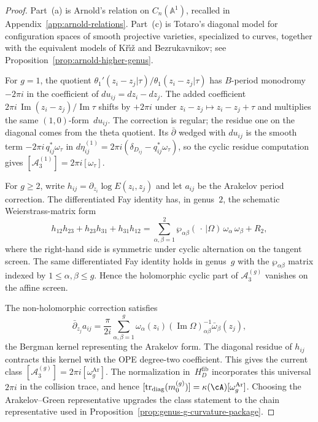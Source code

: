 \begin{proof}
Part~\textup{(a)} is Arnold's relation on
$C_n(\mathbb A^1)$, recalled in
Appendix~\ref{app:arnold-relations}. Part~\textup{(c)} is
Totaro's diagonal model for configuration spaces of smooth
projective varieties, specialized to curves, together with the
equivalent models of K\v{r}\'{\i}\v{z} and Bezrukavnikov; see
Proposition~\ref{prop:arnold-higher-genus}.

For $g=1$, the quotient
$\theta_1'(z_i-z_j|\tau)/\theta_1(z_i-z_j|\tau)$ has
$B$-period monodromy $-2\pi i$ in the coefficient of
$du_{ij}=dz_i-dz_j$. The added coefficient
$2\pi i\,\operatorname{Im}(z_i-z_j)/\operatorname{Im}\tau$ shifts by
$+2\pi i$ under $z_i-z_j\mapsto z_i-z_j+\tau$ and multiplies the same
$(1,0)$-form~$du_{ij}$. The correction is regular; the residue one on
the diagonal comes from the theta quotient. Its $\bar\partial$ wedged
with $du_{ij}$ is the smooth term
$-2\pi i\,q_{ij}^{*}\omega_\tau$ in
$d\eta_{ij}^{(1)}=2\pi i(\delta_{D_{ij}}-q_{ij}^{*}\omega_\tau)$, so
the cyclic residue computation gives
$[\mathcal A_3^{(1)}]=2\pi i[\omega_\tau]$.

For $g\ge2$, write
$h_{ij}=\partial_{z_i}\log E(z_i,z_j)$ and let $a_{ij}$ be the
Arakelov period correction. The differentiated Fay identity has, in
genus~$2$, the schematic Weierstrass-matrix form
\begin{equation}\label{eq:fay-g2}
h_{12}h_{23}+h_{23}h_{31}+h_{31}h_{12}
=
\sum_{\alpha,\beta=1}^{2}
\wp_{\alpha\beta}(\,\cdot\,|\Omega)\,
\omega_\alpha\,\omega_\beta
+R_2,
\end{equation}
where the right-hand side is symmetric under cyclic alternation on
the tangent screen. The same differentiated Fay identity holds in
genus~$g$ with the $\wp_{\alpha\beta}$ matrix indexed by
$1\leq\alpha,\beta\leq g$. Hence the holomorphic cyclic part of
$\mathcal A_3^{(g)}$ vanishes on the affine screen.

The non-holomorphic correction satisfies
\[
\bar\partial_{z_j}a_{ij}
=
\frac{\pi}{2i}
\sum_{\alpha,\beta=1}^{g}
\omega_\alpha(z_i)(\operatorname{Im}\Omega)^{-1}_{\alpha\beta}
\bar\omega_\beta(z_j),
\]
the Bergman kernel representing the Arakelov form. The diagonal
residue of $h_{ij}$ contracts this kernel with the OPE
degree-two coefficient. This gives the current class
$[\mathcal A_3^{(g)}]=2\pi i[\omega_g^{\mathrm{Ar}}]$.  The
normalization in~$H_D^{\mathrm{fib}}$ incorporates this universal
$2\pi i$ in the collision trace, and hence
$[\operatorname{tr}_{\mathrm{diag}}(m_0^{(g)})]
=\kappa(\cA)[\omega_g^{\mathrm{Ar}}]$. Choosing the
Arakelov--Green representative upgrades the class statement to the
chain representative used in
Proposition~\ref{prop:genus-g-curvature-package}.
\end{proof}

